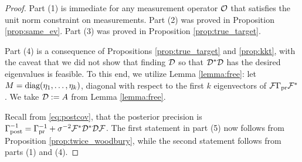 \begin{proof}
  Part (1) is immediate for any measurement operator $\mathcal{O}$ that
  satisfies the unit norm constraint on measurements. Part (2)
  was proved in Proposition \ref{prop:same_ev}. Part (3) was proved in
  Proposition \ref{prop:true_target}.
  
  Part (4) is a consequence of Propositions \ref{prop:true_target} and
  \ref{prop:kkt}, with the caveat that we did not show that finding
  $\mathcal{D}$ so that $\mathcal{D}^*\mathcal{D}$ has the desired eigenvalues is
  feasible. To this end, we utilize Lemma \ref{lemma:free}: let $M =
  \textup{diag}(\eta_1, \dots, \eta_k)$, diagonal with respect to the first
  $k$ eigenvectors of $\mathcal{F} \Gamma_{\textup{pr}} \mathcal{F}^*$. We take $\mathcal{D} := A$ from
  Lemma \ref{lemma:free}.
  
  Recall from \eqref{eq:postcov}, that the posterior precision is
  $\Gamma_{\textup{post}}^{-1} = \Gamma_{\textup{pr}}^{-1} + \sigma^{-2}\mathcal{F}^*\mathcal{D}^*\mathcal{D}\mathcal{F}$. The
  first statement in part (5) now follows from Proposition
  \ref{prop:twice_woodbury}, while the second statement follows from
  parts (1) and (4).
\end{proof}


\optimalvsnot

